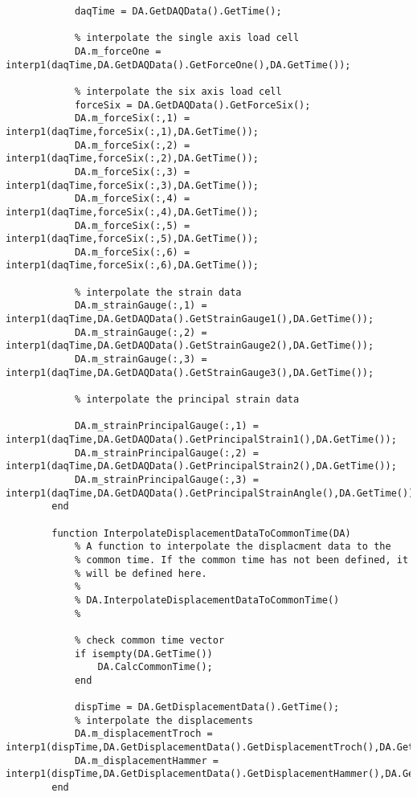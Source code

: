 \begin{lstlisting}
            daqTime = DA.GetDAQData().GetTime();
            
            % interpolate the single axis load cell
            DA.m_forceOne = interp1(daqTime,DA.GetDAQData().GetForceOne(),DA.GetTime());
            
            % interpolate the six axis load cell
            forceSix = DA.GetDAQData().GetForceSix();
            DA.m_forceSix(:,1) = interp1(daqTime,forceSix(:,1),DA.GetTime());
            DA.m_forceSix(:,2) = interp1(daqTime,forceSix(:,2),DA.GetTime());
            DA.m_forceSix(:,3) = interp1(daqTime,forceSix(:,3),DA.GetTime());
            DA.m_forceSix(:,4) = interp1(daqTime,forceSix(:,4),DA.GetTime());
            DA.m_forceSix(:,5) = interp1(daqTime,forceSix(:,5),DA.GetTime());
            DA.m_forceSix(:,6) = interp1(daqTime,forceSix(:,6),DA.GetTime());
            
            % interpolate the strain data
            DA.m_strainGauge(:,1) = interp1(daqTime,DA.GetDAQData().GetStrainGauge1(),DA.GetTime());
            DA.m_strainGauge(:,2) = interp1(daqTime,DA.GetDAQData().GetStrainGauge2(),DA.GetTime());
            DA.m_strainGauge(:,3) = interp1(daqTime,DA.GetDAQData().GetStrainGauge3(),DA.GetTime());
            
            % interpolate the principal strain data
            
            DA.m_strainPrincipalGauge(:,1) = interp1(daqTime,DA.GetDAQData().GetPrincipalStrain1(),DA.GetTime());
            DA.m_strainPrincipalGauge(:,2) = interp1(daqTime,DA.GetDAQData().GetPrincipalStrain2(),DA.GetTime());
            DA.m_strainPrincipalGauge(:,3) = interp1(daqTime,DA.GetDAQData().GetPrincipalStrainAngle(),DA.GetTime());
        end
        
        function InterpolateDisplacementDataToCommonTime(DA)
            % A function to interpolate the displacment data to the
            % common time. If the common time has not been defined, it
            % will be defined here.
            %
            % DA.InterpolateDisplacementDataToCommonTime()
            %
            
            % check common time vector
            if isempty(DA.GetTime())
                DA.CalcCommonTime();
            end
            
            dispTime = DA.GetDisplacementData().GetTime();
            % interpolate the displacements
            DA.m_displacementTroch = interp1(dispTime,DA.GetDisplacementData().GetDisplacementTroch(),DA.GetTime());
            DA.m_displacementHammer = interp1(dispTime,DA.GetDisplacementData().GetDisplacementHammer(),DA.GetTime());
        end
        

\end{lstlisting}
